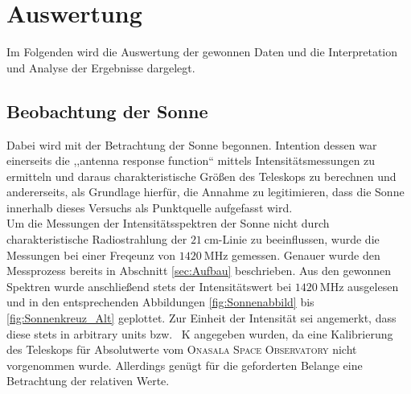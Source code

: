 \section{Auswertung}
Im Folgenden wird die Auswertung der gewonnen Daten und die Interpretation und Analyse der Ergebnisse dargelegt.
    \subsection{Beobachtung der Sonne}
    Dabei wird mit der Betrachtung der Sonne begonnen.
    Intention dessen war einerseits die ,,antenna response function`` mittels Intensitätsmessungen zu ermitteln und
    daraus charakteristische Größen des Teleskops zu berechnen und andererseits, als Grundlage hierfür, die Annahme zu legitimieren,
    dass die Sonne innerhalb dieses Versuchs als Punktquelle aufgefasst wird.\\

    Um die Messungen der Intensitätsspektren der Sonne nicht durch charakteristische Radiostrahlung der
    $\SI{21}{\centi \metre}$-Linie zu beeinflussen,
    wurde die Messungen bei einer Freqeunz von $\SI{1420}{\mega \hertz}$ gemessen.
    Genauer wurde den Messprozess bereits in Abschnitt \ref{sec:Aufbau} beschrieben. 
    Aus den gewonnen Spektren wurde anschließend stets der Intensitätswert bei $\SI{1420}{\mega \hertz}$ ausgelesen und in den entsprechenden Abbildungen \ref{fig:Sonnenabbild} bis \ref{fig:Sonnenkreuz_Alt} geplottet. 
    Zur Einheit der Intensität sei angemerkt, dass diese stets in \dq arbitrary units\dq{} bzw. \SI{}{\kelvin} angegeben wurden,
    da eine Kalibrierung des Teleskops für Absolutwerte vom \textsc{Onasala Space Observatory} nicht vorgenommen wurde.
    Allerdings genügt für die geforderten Belange eine Betrachtung der relativen Werte.\\
